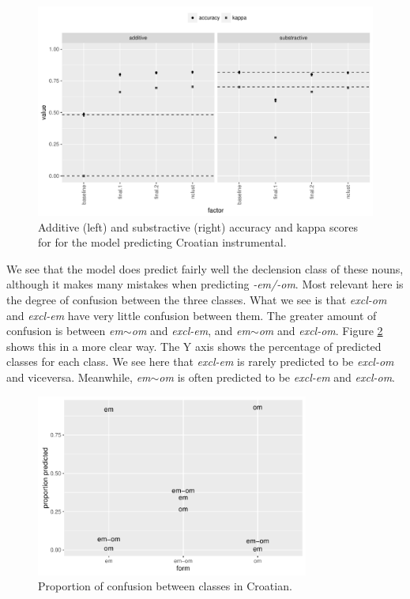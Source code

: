 \begin{figure}[!htpb]
  \centering
  \includegraphics[width=1.0\textwidth]{./figures/croatian/factimp-plot.pdf}
    \caption{Additive (left) and substractive (right) accuracy and kappa scores for for the model predicting Croatian instrumental.}\label{fig:factimp-plot-croatian}
\end{figure}

We see that the model does predict fairly well the declension class of these nouns, although it makes many mistakes when predicting \textit{-em/-om}. Most relevant here is the degree of confusion between the three classes. What we see is that \textit{excl-om} and \textit{excl-em} have very little confusion between them. The greater amount of confusion is between \textit{em}$\sim$\textit{om} and \textit{excl-em}, and \textit{em}$\sim$\textit{om} and \textit{excl-om}. Figure \ref{fig:croatian-results} shows this in a more clear way. The Y axis shows the percentage of predicted classes for each class. We see here that  \textit{excl-em} is rarely predicted to be  \textit{excl-om} and viceversa. Meanwhile, \textit{em}$\sim$\textit{om} is often predicted to be \textit{excl-em} and \textit{excl-om}.

\begin{figure}[!htpb]
  \centering
  \includegraphics[width=0.8\textwidth]{./figures/croatian/croatian.pdf}
  \caption{Proportion of confusion between classes in Croatian.}\label{fig:croatian-results}
\end{figure}

